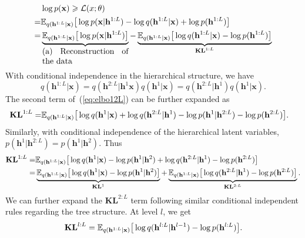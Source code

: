 \documentclass[twoside]{article}
\begin{document}
\begin{align} \notag  %
&\log p(\mathbf{x})  \geqslant  \mathcal{L}(x; \theta) \\ \notag
=& \mathbb{E}_{q(\mathbf{h}^{1:L}|\mathbf{x})}\big[ \log p(\mathbf{x}|\mathbf{h}^{1:L}) -  \log q(\mathbf{h}^{1:L}|\mathbf{x}) +  \log p(\mathbf{h}^{1:L}) \big] \\ \label{eq:elbo12L}
=&  \underbrace{\mathbb{E}_{q(\mathbf{h}^{1:L}|\mathbf{x})}\big[ \log p(\mathbf{x}|\mathbf{h}^{1:L})\big]}_{\parbox{10.5em}{(a) Reconstruction of the data}}  -  \underbrace{\mathbb{E}_{q(\mathbf{h}^{1:L}|\mathbf{x})}\big[ \log q(\mathbf{h}^{1:L}|\mathbf{x}) - \log p(\mathbf{h}^{1:L}) \big] }_{\textbf{\text{KL}}^{1:L}}
\end{align}
With conditional independence in   the hierarchical structure, we have 
$$q(\mathbf{h}^{1:L}|\mathbf{x})=q(\mathbf{h}^{2:L}|\mathbf{h}^1\mathbf{x})q(\mathbf{h}^{1}|\mathbf{x})=q(\mathbf{h}^{2:L}|\mathbf{h}^1)q(\mathbf{h}^{1}|\mathbf{x}).$$
The second term of~(\ref{eq:elbo12L}) can be further expanded as 
 \begin{align} \notag 
\textbf{\text{KL}}^{1:L} =&  \mathbb{E}_{q(\mathbf{h}^{1:L}|\mathbf{x})}\big[  \log q(\mathbf{h}^{1}|\mathbf{x})  +  \log q(\mathbf{h}^{2:L}|\mathbf{h}^{1})  - \log p(\mathbf{h}^{1}|\mathbf{h}^{2:L}) - \log p(\mathbf{h}^{2:L})  \big].
\end{align}
Similarly, with conditional independence of the hierarchical latent variables, $ p(\mathbf{h}^{1}|\mathbf{h}^{2:L})= p(\mathbf{h}^{1}|\mathbf{h}^{2})$. Thus
 \begin{align} \notag 
\textbf{\text{KL}}^{1:L} =&  \mathbb{E}_{q(\mathbf{h}^{1:L}|\mathbf{x})}\big[  \log q(\mathbf{h}^{1}|\mathbf{x})   - \log p(\mathbf{h}^{1}|\mathbf{h}^{2})  +  \log q(\mathbf{h}^{2:L}|\mathbf{h}^{1})- \log p(\mathbf{h}^{2:L})  \big]\\ \notag
=&  \underbrace{\mathbb{E}_{q(\mathbf{h}^{1:L}|\mathbf{x})}\big[  \log q(\mathbf{h}^{1}|\mathbf{x})   - \log p(\mathbf{h}^{1}|\mathbf{h}^{2}) \big]}_{\mathbf{KL}^1} + \underbrace{\mathbb{E}_{q(\mathbf{h}^{1:L}|\mathbf{x})}\big[  \log q(\mathbf{h}^{2:L}|\mathbf{h}^{1})- \log p(\mathbf{h}^{2:L})  \big]}_{\mathbf{KL}^{2:L}}.
\end{align}
We can further expand the $\mathbf{KL}^{2:L}$ term following similar conditional independent rules regarding the tree structure.
At level $l$, we get
$$\textbf{\text{KL}}^{l:L} 
= \mathbb{E}_{q(\mathbf{h}^{1:L}|\mathbf{x})}\big[  \log q(\mathbf{h}^{l:L}|\mathbf{h}^{l-1})- \log p(\mathbf{h}^{l:L})  \big].$$
\end{document}
